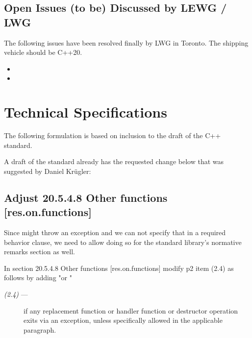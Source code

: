 \documentclass[ebook,11pt,article]{memoir}
\begin{document}
\section{Open Issues (to be) Discussed by LEWG / LWG}
The following issues have been resolved finally by LWG in Toronto. The shipping vehicle should be C++20.
\begin{itemize}
\item {}
\item {}
\end{itemize}

\newpage
\chapter{Technical Specifications}
The following formulation is based on inclusion to the draft of the C++ standard. 

A draft of the standard already has the requested change below that was suggested by Daniel Kr\"ugler:

\section{Adjust 20.5.4.8 Other functions [res.on.functions]}
Since  might throw an exception and we can not specify that in a required behavior clause, we need to allow doing so for the standard library's normative remarks section as well.

In section 20.5.4.8 Other functions [res.on.functions] modify p2 item (2.4) as follows by adding "or \remarks"

\begin{description}
\item[\textit{(2.4)} ---]
if any replacement function or handler function or destructor operation exits via an exception,
unless specifically allowed
in the applicable
\required {}
paragraph.
\end{description}
\end{document}
